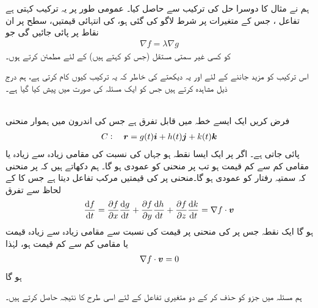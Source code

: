 ہم نے مثال  کا دوسرا حل   
 کی ترکیب سے حاصل کیا۔  عمومی طور پر یہ ترکیب کہتی  ہے  تفاعل ،    جس کے متغیرات پر  شرط  لاگو کی گئی ہو،   کی انتہائی قیمتیں،  سطح  پر  ان  نقاط پر پائی جائیں گی جو 
\begin{align*}
\nabla f=\lambda \nabla g
\end{align*}
کو کسی غیر سمتی مستقل  (جس کو  کہتے ہیں)  کے لئے مطمئن کرتے ہوں۔

اس ترکیب  کو مزید جاننے کے لئے  اور یہ  دیکھتے  کی خاطر  کہ  یہ ترکیب کیوں کام کرتی ہے، ہم درج ذیل  مشاہدہ کرتے ہیں جس کو ایک مسئلہ کی صورت میں پیش کیا گیا ہے۔

\\
 فرض کریں    ایک ایسے خطہ میں قابل تفرق ہے جس کی اندرون میں ہموار منحنی
\begin{align*}
C:\quad {\ensuremath{{\boldsymbol{r}}}}=g(t){\boldsymbol{i}}+h(t){\boldsymbol{j}}+k(t){\boldsymbol{k}}
\end{align*}
پائی جاتی ہے۔ اگر  پر  ایک ایسا  نقطہ ہو جہاں  کی نسبت   کی  مقامی زیادہ سے زیادہ یا مقامی کم سے کم قیمت ہو تب  پر  منحنی  کو عمودی ہو گا۔ 
ہم دکھاتے ہیں کہ  پر منحنی کہ سمتیہ رفتار کو  عمودی ہو گا۔منحنی  پر  کی قیمتیں  مرکب تفاعل   دیتا ہے جس کا  کے لحاظ سے تفرق
\begin{align*}
\frac{\dif f}{\dif t}=\frac{\partial f}{\partial x}\frac{\dif g}{\dif t}+\frac{\partial f}{\partial y}\frac{\dif h}{\dif t}+\frac{\partial f}{\partial z}\frac{\dif k}{\dif t}=\nabla f\cdot \kvec{v}
\end{align*}
ہو گا ایک نقطہ  جس پر   کی منحنی پر قیمت کی نسبت سے  مقامی زیادہ سے زیادہ قیمت یا مقامی کم سے کم قیمت ہو،   لہٰذا
\begin{align*}
\nabla f\cdot {\ensuremath{{\boldsymbol{v}}}}=0
\end{align*}
ہو گا

ہم مسئلہ  میں جزو  کو حذف  کر کے دو متغیری  تفاعل  کے لئے اسی طرح کا نتیجہ حاصل کرتے ہیں۔

